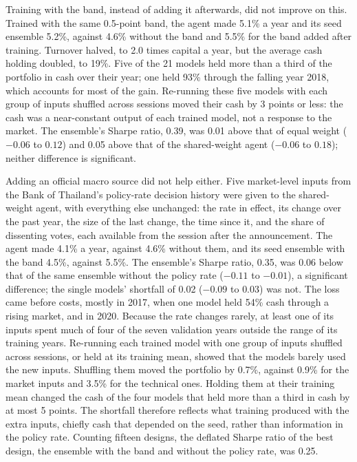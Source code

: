 Training with the band, instead of adding it afterwards, did not improve on this. Trained with the same
0.5-point band, the agent made 5.1\% a year and its seed ensemble 5.2\%, against 4.6\% without the band
and 5.5\% for the band added after training. Turnover halved, to 2.0 times capital a year, but the
average cash holding doubled, to 19\%. Five of the 21 models held more than a third of the portfolio in
cash over their year; one held 93\% through the falling year 2018, which accounts for most of the gain.
Re-running these five models with each group of inputs shuffled across sessions moved their cash by
3 points or less: the cash was a near-constant output of each trained model, not a response to the market.
The ensemble's Sharpe ratio, 0.39, was 0.01 above that of equal weight ($-0.06$ to $0.12$) and 0.05
above that of the shared-weight agent ($-0.06$ to $0.18$); neither difference is significant.

Adding an official macro source did not help either. Five market-level inputs from the Bank of
Thailand's policy-rate decision history were given to the shared-weight agent, with everything else
unchanged: the rate in effect, its change over the past year, the size of the last change, the time
since it, and the share of dissenting votes, each available from the session after the announcement.
The agent made 4.1\% a year, against 4.6\% without them, and its seed ensemble with the band 4.5\%,
against 5.5\%. The ensemble's Sharpe ratio, 0.35, was 0.06 below that of the same ensemble without the
policy rate ($-0.11$ to $-0.01$), a significant difference; the single models' shortfall of 0.02
($-0.09$ to $0.03$) was not. The loss came before costs, mostly in 2017, when one model held 54\% cash
through a rising market, and in 2020. Because the rate changes rarely, at least one of its inputs spent
much of four of the seven validation years outside the range of its training years. Re-running each
trained model with one group of inputs shuffled across sessions, or held at its training mean, showed
that the models barely used the new inputs. Shuffling them moved the portfolio by 0.7\%, against 0.9\%
for the market inputs and 3.5\% for the technical ones. Holding them at their training mean changed the
cash of the four models that held more than a third in cash by at most 5 points. The shortfall
therefore reflects what training produced with the extra inputs, chiefly cash that depended on the
seed, rather than information in the policy rate. Counting fifteen designs, the deflated Sharpe ratio
of the best design, the ensemble with the band and without the policy rate, was 0.25.

